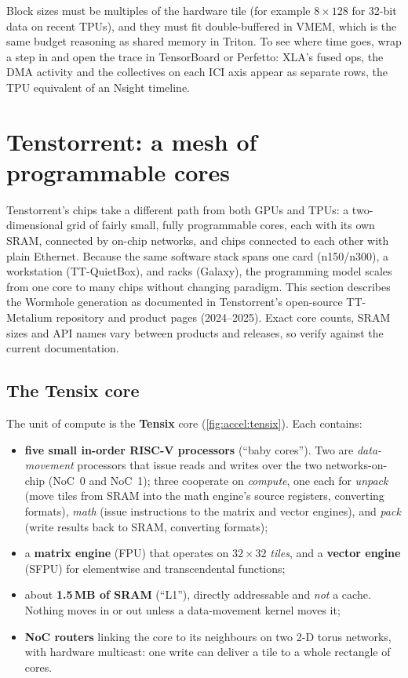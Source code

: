 Block sizes must be multiples of the hardware tile (for example $8\times128$ for 32-bit data on
recent TPUs), and they must fit double-buffered in VMEM, which is the same budget reasoning as shared
memory in Triton. To see where time goes, wrap a step in  and open the
trace in TensorBoard or Perfetto: XLA's fused ops, the DMA activity and the collectives on each ICI axis appear
as separate rows, the TPU equivalent of an Nsight timeline.

\section{Tenstorrent: a mesh of programmable cores}\label{sec:accel:tt}

Tenstorrent's chips take a different path from both GPUs and TPUs: a two-dimensional grid of
fairly small, fully programmable cores, each with its own SRAM, connected by on-chip networks, and
chips connected to each other with plain Ethernet. Because the same software stack spans one card
(n150/n300), a workstation (TT-QuietBox), and racks (Galaxy), the programming model scales from one
core to many chips without changing paradigm. This section describes the Wormhole generation as
documented in Tenstorrent's open-source TT-Metalium repository and product pages (2024--2025).
Exact core counts, SRAM sizes and API names vary between products and releases, so verify against the
current documentation.

\subsection{The Tensix core}

The unit of compute is the \textbf{Tensix} core (\cref{fig:accel:tensix}). Each contains:
\begin{itemize}
  \item \textbf{five small in-order RISC-V processors} (``baby cores''). Two are
    \emph{data-movement} processors that issue reads and writes over the two networks-on-chip
    (NoC~0 and NoC~1); three cooperate on \emph{compute}, one each for \emph{unpack} (move
    tiles from SRAM into the math engine's source registers, converting formats),
    \emph{math} (issue instructions to the matrix and vector engines), and \emph{pack} (write
    results back to SRAM, converting formats);
  \item a \textbf{matrix engine} (FPU) that operates on $32\times32$ \emph{tiles}, and a
    \textbf{vector engine} (SFPU) for elementwise and transcendental functions;
  \item about \textbf{1.5\,MB of SRAM} (``L1''), directly addressable and \emph{not} a cache.
    Nothing moves in or out unless a data-movement kernel moves it;
  \item \textbf{NoC routers} linking the core to its neighbours on two 2-D torus networks, with
    hardware multicast: one write can deliver a tile to a whole rectangle of cores.
\end{itemize}

